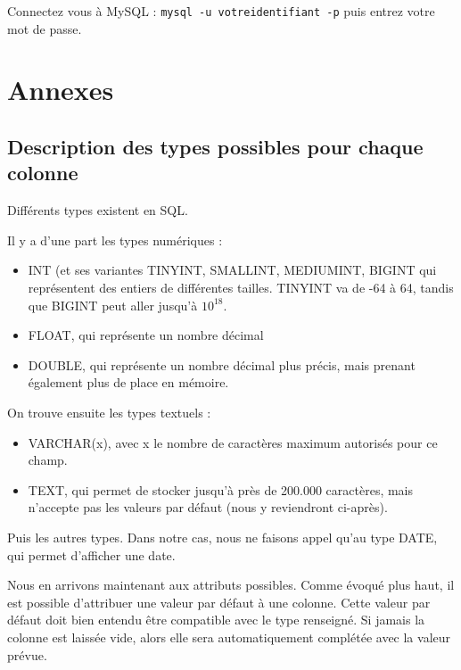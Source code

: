 \documentclass[12pt,a4paper]{article}
\begin{document}
        Connectez vous à MySQL : \verb+mysql -u votreidentifiant -p+ puis entrez votre mot de passe.


\clearpage
\appendix
\section*{Annexes}
    
    \subsection{Description des types possibles pour chaque colonne}\label{types}
        Différents types existent en SQL.
        
        Il y a d'une part les types numériques :
        \begin{itemize}
            \item INT (et ses variantes TINYINT, SMALLINT, MEDIUMINT, BIGINT qui représentent
            des entiers de différentes tailles. TINYINT va de -64 à 64, 
            tandis que BIGINT peut aller jusqu'à $10^{18}$.
            \item FLOAT, qui représente un nombre décimal 
            \item DOUBLE, qui représente un nombre décimal plus précis,
            mais prenant également plus de place en mémoire.
        \end{itemize}

        On trouve ensuite les types textuels :
        \begin{itemize}
            \item VARCHAR(x), avec x le nombre de caractères maximum autorisés
            pour ce champ.
            \item TEXT, qui permet de stocker jusqu'à près de 200.000 caractères,
            mais n'accepte pas les valeurs par défaut (nous y reviendront ci-après).
        \end{itemize}

        Puis les autres types. Dans notre cas, nous ne faisons appel
        qu'au type DATE, qui permet d'afficher une date.

        Nous en arrivons maintenant aux attributs possibles.
        Comme évoqué plus haut, il est possible d'attribuer une valeur
        par défaut à une colonne. Cette valeur par défaut doit bien entendu
        être compatible avec le type renseigné. Si jamais la colonne est laissée
        vide, alors elle sera automatiquement complétée avec la valeur prévue.
\end{document}
